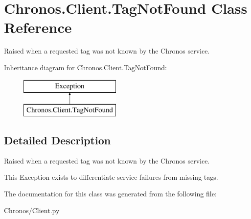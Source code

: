 \hypertarget{classChronos_1_1Client_1_1TagNotFound}{}\section{Chronos.\+Client.\+Tag\+Not\+Found Class Reference}
\label{classChronos_1_1Client_1_1TagNotFound}


Raised when a requested tag was not known by the Chronos service.  


Inheritance diagram for Chronos.\+Client.\+Tag\+Not\+Found\+:\begin{figure}[H]
\begin{center}
\leavevmode
\includegraphics[height=2.000000cm]{classChronos_1_1Client_1_1TagNotFound}
\end{center}
\end{figure}


\subsection{Detailed Description}
Raised when a requested tag was not known by the Chronos service. 

This Exception exists to differentiate service failures from missing tags. 

The documentation for this class was generated from the following file\+:\begin{DoxyCompactItemize}
\item 
Chronos/Client.\+py\end{DoxyCompactItemize}
